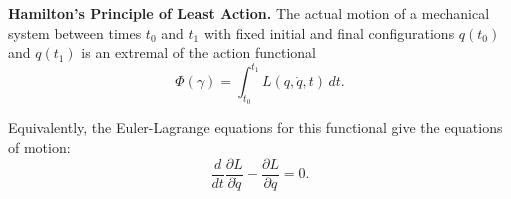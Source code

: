 \textbf{Hamilton's Principle of Least Action.} The actual motion of a mechanical system between times $t_0$ and $t_1$ with fixed initial and final configurations $q(t_0)$ and $q(t_1)$ is an extremal of the action functional
$$\Phi(\gamma) = \int_{t_0}^{t_1} L(q, \dot{q}, t) \, dt.$$

Equivalently, the Euler-Lagrange equations for this functional give the equations of motion:
$$\frac{d}{dt}\frac{\partial L}{\partial \dot{q}} - \frac{\partial L}{\partial q} = 0.$$
